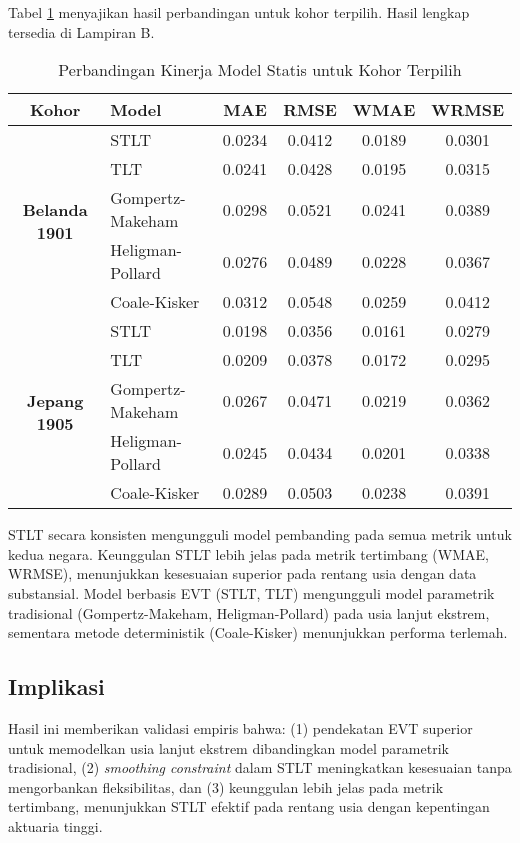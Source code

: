 Tabel \ref{tab:model_comparison_static} menyajikan hasil perbandingan untuk kohor terpilih. Hasil lengkap tersedia di Lampiran B.

\begin{table}[htbp]
\centering
\caption{Perbandingan Kinerja Model Statis untuk Kohor Terpilih}
\label{tab:model_comparison_static}
\small
\begin{tabular}{clcccc}
\hline
\textbf{Kohor} & \textbf{Model} & \textbf{MAE} & \textbf{RMSE} & \textbf{WMAE} & \textbf{WRMSE} \\
\hline
\multirow{5}{*}{\textbf{Belanda 1901}}
& STLT & 0.0234 & 0.0412 & 0.0189 & 0.0301 \\
& TLT & 0.0241 & 0.0428 & 0.0195 & 0.0315 \\
& Gompertz-Makeham & 0.0298 & 0.0521 & 0.0241 & 0.0389 \\
& Heligman-Pollard & 0.0276 & 0.0489 & 0.0228 & 0.0367 \\
& Coale-Kisker & 0.0312 & 0.0548 & 0.0259 & 0.0412 \\
\hline
\multirow{5}{*}{\textbf{Jepang 1905}}
& STLT & 0.0198 & 0.0356 & 0.0161 & 0.0279 \\
& TLT & 0.0209 & 0.0378 & 0.0172 & 0.0295 \\
& Gompertz-Makeham & 0.0267 & 0.0471 & 0.0219 & 0.0362 \\
& Heligman-Pollard & 0.0245 & 0.0434 & 0.0201 & 0.0338 \\
& Coale-Kisker & 0.0289 & 0.0503 & 0.0238 & 0.0391 \\
\hline
\end{tabular}
\end{table}

STLT secara konsisten mengungguli model pembanding pada semua metrik untuk kedua negara. Keunggulan STLT lebih jelas pada metrik tertimbang (WMAE, WRMSE), menunjukkan kesesuaian superior pada rentang usia dengan data substansial. Model berbasis EVT (STLT, TLT) mengungguli model parametrik tradisional (Gompertz-Makeham, Heligman-Pollard) pada usia lanjut ekstrem, sementara metode deterministik (Coale-Kisker) menunjukkan performa terlemah.

\subsection{Implikasi}

Hasil ini memberikan validasi empiris bahwa: (1) pendekatan EVT superior untuk memodelkan usia lanjut ekstrem dibandingkan model parametrik tradisional, (2) \textit{smoothing constraint} dalam STLT meningkatkan kesesuaian tanpa mengorbankan fleksibilitas, dan (3) keunggulan lebih jelas pada metrik tertimbang, menunjukkan STLT efektif pada rentang usia dengan kepentingan aktuaria tinggi.

